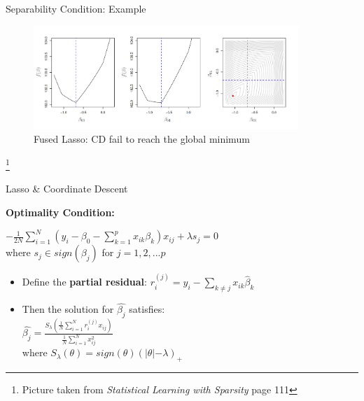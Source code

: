 \documentclass{beamer}
\begin{document}
\begin{frame}{Separability Condition: Example}
\begin{figure}[h]
\centering
\includegraphics[width=10cm]{img/Fused}
\caption{ Fused Lasso: CD fail to reach the global minimum}
\end{figure}
 \footnote{Picture taken from \textit{Statistical Learning with Sparsity}  page 111 }
\end{frame}

\begin{frame}{Lasso \& Coordinate Descent}

\textbf{Optimality Condition:}
\vspace*{4mm}

\(-\frac{1}{2N}\sum_{i=1}^{N}(y_{i}-\beta_0-\sum_{k=1}^{p}x_{ik}\beta_k)x_{ij}+ \lambda s_j=0\)
\vspace*{4mm}
 \\where \(s_j \in sign(\beta_j)\) for \(j=1,2,...p\)
 \vspace*{6mm}
 \begin{itemize}
     \item Define the \textbf{partial residual}: \(r_{i}^{(j)}=y_i-\sum_{k\neq j}x_{ik}\hat{\beta}_k\)
    \item Then the solution for \(\hat{\beta_j}\) satisfies:\\
\vspace*{4mm}
    \(\hat{\beta_j}=\frac{S_{\lambda}(\frac{1}{N}\sum_{i=1}^{N}r_i^{(j)}       x_{ij} )}{\frac{1}{N}\sum_{i=1}^{N}x_{ij}^2}\)\\
\vspace*{4mm}
    where \(S_{\lambda}(\theta) =sign(\theta)(\lvert\theta\lvert-\lambda)_{+}\)
\end{itemize}
    
\end{frame}
\end{document}
